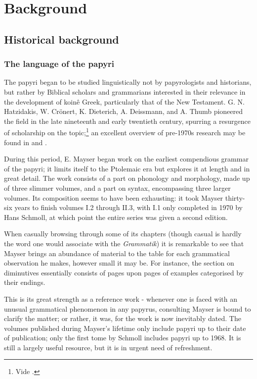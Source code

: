 \chapter{Background}
\label{chp:background} %

\section{Historical background}

\subsection{The language of the papyri}
\label{sec:lpapyri}
The papyri began to be studied linguistically not by papyrologists and
historians, but rather by Biblical scholars and grammarians interested in
their relevance in the development of koin\^{e} Greek,
particularly that of the New Testament. G. N.  Hatzidakis,
W. Cr\"onert, K. Dieterich, A. Deissmann, and A.  Thumb pioneered the
field in the late nineteenth and early twentieth century, spurring a
resurgence of scholarship on the topic;\footnote{Vide
  \cite{cronert1903,deissmann1895,deissmann1897,deissmann1929,dieterich1898,thumb1901,thumb1897}.}
an excellent overview of pre-1970s research may be found in
\cite{mandilaras1973} and \cite{gignac1976,gignac1981}.

During this period, E. Mayser began work on the earliest compendious
grammar of the papyri; it limits itself to the Ptolemaic era but
explores it at length and in great detail.  The work \citep{mayser} consists of a
part on phonology and morphology, made up of three slimmer volumes,
and a part on syntax, encompassing three larger volumes. Its
composition seems to have been exhausting: it took Mayser thirty-six
years to finish volumes I.2 through II.3, with I.1 only completed in
1970 by Hans Schmoll, at which point the entire series was given a
second edition.

When casually browsing through some of its chapters (though casual is
hardly the word one would associate with the \textit{Grammatik}) it is
remarkable to see that Mayser brings an abundance of material to the
table for each grammatical observation he makes, however small it may
be. For instance, the section on diminutives essentially consists of
pages upon pages of examples categorised by their endings.

This is its great strength as a reference work - whenever one is faced
with an unusual grammatical phenomenon in any papyrus, consulting
Mayser is bound to clarify the matter; or rather, it was, for the work
is now inevitably dated.  The volumes published during Mayser's
lifetime only include papyri up to their date of publication; only the
first tome by Schmoll includes papyri up to 1968.  It is still a
largely useful resource, but it is in urgent need of refreshment.

